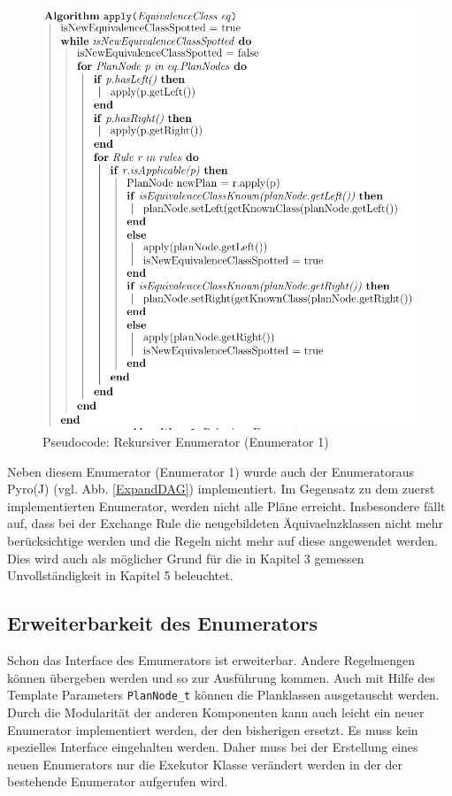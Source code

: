 \begin{figure}[ht]
  \centering
  \includegraphics[scale=0.4]{04_Implementierung/00_media/Enumerator.png}
  \caption{Pseudocode: Rekursiver Enumerator (Enumerator 1)}
  \label{Pseudocode:enumerator}
\end{figure}



Neben diesem Enumerator (Enumerator 1) wurde auch der Enumeratoraus Pyro(J) (vgl. Abb. \ref{ExpandDAG}) implementiert. Im Gegensatz zu dem zuerst implementierten Enumerator, werden nicht alle Pläne erreicht. Insbesondere fällt auf, dass bei der Exchange Rule die neugebildeten Äquivaelnzklassen nicht mehr berücksichtige werden und die Regeln nicht mehr auf diese angewendet werden. Dies wird auch als möglicher Grund für die in Kapitel 3 gemessen Unvollständigkeit in Kapitel 5 beleuchtet.



\subsection{Erweiterbarkeit des Enumerators}

Schon das Interface des Emumerators ist erweiterbar. Andere Regelmengen können übergeben werden und so zur Ausführung kommen. Auch mit Hilfe des Template Parameters \texttt{PlanNode\_t} können die Planklassen ausgetauscht werden. Durch die Modularität der anderen Komponenten kann auch leicht ein neuer Enumerator implementiert werden, der den bisherigen ersetzt. Es muss kein spezielles Interface eingehalten werden. Daher muss bei der Erstellung eines neuen Enumerators nur die Exekutor Klasse verändert werden in der der bestehende Enumerator aufgerufen wird.